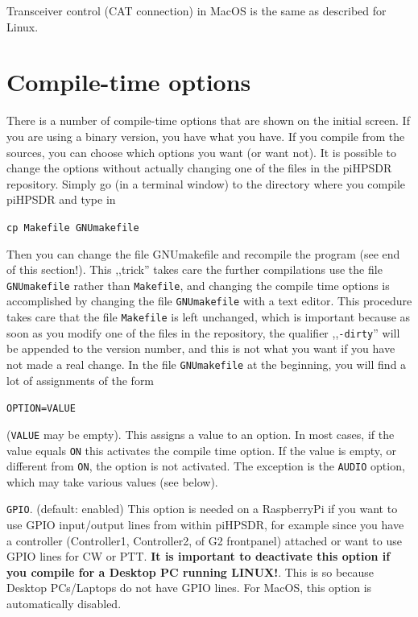 \documentclass[12pt]{book}
\def\rett#1{\texttt{\color{red}#1}}
\def\grtt#1{\texttt{\color{magenta}#1}}
\begin{document}
Transceiver control (CAT connection) in MacOS is the same as described for Linux.

\chapter{Compile-time options}
\label{sec:compiletime}

There is a number of compile-time options that are shown on the initial screen. If you are using a binary
version,
you have what you have. If you compile from the sources, you can choose which options you want (or want
not).
It is possible to change the options without actually changing one of the files in the piHPSDR repository.
Simply go (in a terminal window) to the directory where you compile piHPSDR and type in

\grtt{cp Makefile GNUmakefile}

Then you can change the file GNUmakefile and recompile the program (see end of this section!).
This ,,trick'' takes care the further compilations use the file \texttt{GNUmakefile} rather than
\texttt{Makefile},
and changing the compile time options is accomplished by changing the file \texttt{GNUmakefile} with a text
editor. This procedure takes care that the file \texttt{Makefile} is left unchanged,
 which is important because as soon as you  modify
one of the files in the repository, the qualifier ,,\texttt{-dirty}'' will be appended to the version number,
and this is  not what you want if you have not made a real change.
In the file \texttt{GNUmakefile} at the beginning, you will find a lot of assignments of the form

\texttt{OPTION=VALUE}

(\texttt{VALUE} may be empty). This assigns a value to an option. In most cases, if the value equals
\texttt{ON} this activates the compile time option. If the value is empty, or different from \texttt{ON},
the option is not activated. The exception is the \texttt{AUDIO} option, which may take various values
(see below).


\rett{GPIO}. (default: enabled)
This option is needed on a RaspberryPi if you want to use GPIO input/output lines from
within piHPSDR, for example since you have a controller (Controller1, Controller2, of G2 frontpanel)
attached or want to use GPIO lines for CW or PTT. \textbf{It is important to deactivate this option
if you compile for a Desktop PC running LINUX!}. This is so because Desktop PCs/Laptops do not
have GPIO lines. For MacOS, this option is automatically disabled.
\end{document}
